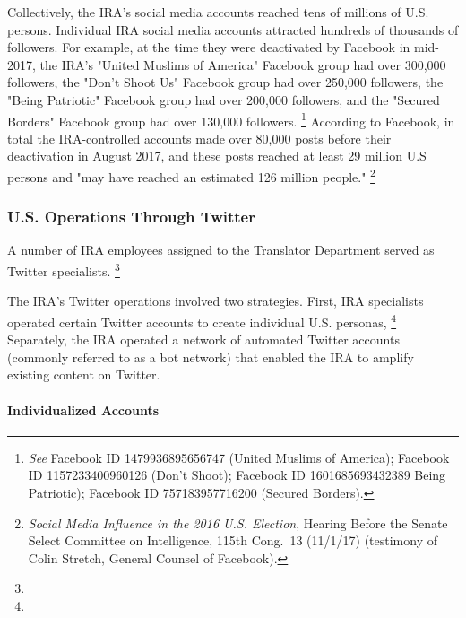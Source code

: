 Collectively, the IRA's social media accounts reached tens of millions of U.S. persons.
Individual IRA social media accounts attracted hundreds of thousands of followers.
For example, at the time they were deactivated by Facebook in mid-2017, the IRA's "United Muslims of America" Facebook group had over 300,000 followers, the "Don't Shoot Us" Facebook group had over 250,000 followers, the "Being Patriotic" Facebook group had over 200,000 followers, and the "Secured Borders" Facebook group had over 130,000 followers.%
\footnote{\textit{See} Facebook ID 1479936895656747 (United Muslims of America);
Facebook ID 1157233400960126 (Don't Shoot);
Facebook ID 1601685693432389 Being Patriotic);
Facebook ID 757183957716200 (Secured Borders).


}
According to Facebook, in total the IRA-controlled accounts made over 80,000 posts before their deactivation in August 2017, and these posts reached at least 29 million U.S persons and "may have reached an estimated 126 million people."%
\footnote{\textit{Social Media Influence in the 2016 U.S. Election}, Hearing Before the Senate Select Committee on Intelligence, 115th Cong.~13 (11/1/17) (testimony of Colin Stretch, General Counsel of Facebook).}

\subsubsection{U.S. Operations Through Twitter}

A number of IRA employees assigned to the Translator Department served as Twitter specialists.
\footnote{}

The IRA's Twitter operations involved two strategies.
First, IRA specialists operated certain Twitter accounts to create individual U.S. personas, %
\footnote{}
Separately, the IRA operated a network of automated Twitter accounts (commonly referred to as a bot network) that enabled the IRA to amplify existing content on Twitter.

\paragraph{Individualized Accounts}

